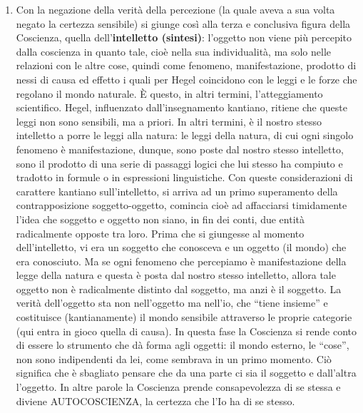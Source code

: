 \documentclass[a4paper,12pt,oneside,openany]{book}%
\begin{document}
\begin{enumerate}
	\item Con la negazione della verità della percezione (la quale aveva a sua volta negato la certezza sensibile) si giunge così alla terza e conclusiva figura della Coscienza, quella dell’\textbf{intelletto (sintesi)}: l’oggetto non viene più percepito dalla coscienza in quanto tale, cioè nella sua individualità, ma solo nelle relazioni con le altre cose, quindi come fenomeno, manifestazione, prodotto di nessi di causa ed effetto i quali per Hegel coincidono con le leggi e le forze che regolano il mondo naturale. È questo, in altri termini, l’atteggiamento scientifico. Hegel, influenzato dall’insegnamento kantiano, ritiene che queste leggi non sono sensibili, ma a priori. In altri termini, è il nostro stesso intelletto a porre le leggi alla natura: le leggi della natura, di cui ogni singolo fenomeno è manifestazione, dunque, sono poste dal nostro stesso intelletto, sono il prodotto di una serie di passaggi logici che lui stesso ha compiuto e tradotto in formule o in espressioni linguistiche. Con queste considerazioni di carattere kantiano sull’intelletto, si arriva ad un primo superamento della contrapposizione soggetto-oggetto, comincia cioè ad affacciarsi timidamente l’idea che soggetto e oggetto non siano, in fin dei conti, due entità radicalmente opposte tra loro. Prima che si giungesse al momento dell’intelletto, vi era un soggetto che conosceva e un oggetto (il mondo) che era conosciuto. Ma se ogni fenomeno che percepiamo è manifestazione della legge della natura e questa è posta dal nostro stesso intelletto, allora tale oggetto non è radicalmente distinto dal soggetto, ma anzi è il soggetto. La verità dell’oggetto sta non nell’oggetto ma nell’io, che “tiene insieme” e costituisce (kantianamente) il mondo sensibile attraverso le proprie categorie (qui entra in gioco quella di causa). In questa fase la Coscienza si rende conto di essere lo strumento che dà forma agli oggetti: il mondo esterno, le “cose”, non sono indipendenti da lei, come sembrava in un primo momento. Ciò significa che è sbagliato pensare che da una parte ci sia il soggetto e dall’altra l’oggetto. In altre parole la Coscienza prende consapevolezza di se stessa e diviene AUTOCOSCIENZA, la certezza che l’Io ha di se stesso.
	
\end{enumerate}
\end{document}
